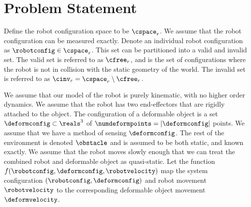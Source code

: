 \section{Problem Statement}
\label{sec:main_problem_statement}


Define the robot configuration space to be $\cspace_r$. We assume that the robot configuration can be measured exactly. Denote an individual robot configuration as $\robotconfig \in \cspace_r$. This set can be partitioned into a valid and invalid set. The valid set is referred to as $\cfree_r$, and is the set of configurations where the robot is not in collision with the static geometry of the world. The invalid set is referred to as $\cinv_r = \cspace_r \setminus \cfree_r$.

We assume that our model of the robot is purely kinematic, with no higher order dynamics. We assume that the robot has two end-effectors that are rigidly attached to the object. The configuration of a deformable object is a set $\deformconfig \subset \reals^3$ of $\numdeformpoints = | \deformconfig |$ points. We assume that we have a method of sensing $\deformconfig$. The rest of the environment is denoted $\obstacle$ and is assumed to be both static, and known exactly. We assume that the robot moves slowly enough that we can treat the combined robot and deformable object as quasi-static. Let the function $f(\robotconfig, \deformconfig, \robotvelocity)$ map the system configuration $(\robotconfig, \deformconfig)$ and robot movement $\robotvelocity$ to the corresponding deformable object movement $\deformvelocity$.

